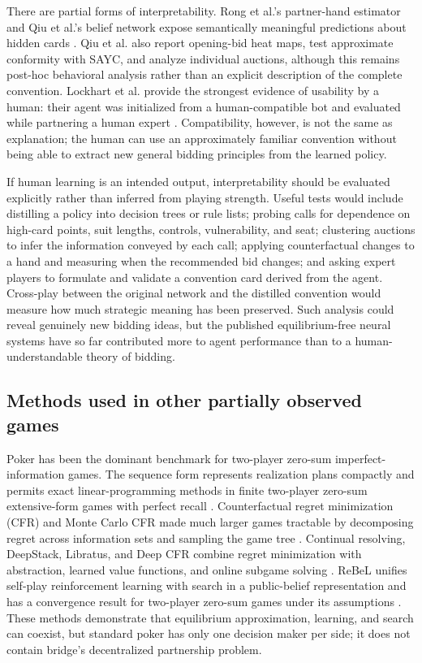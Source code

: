 \documentclass[11pt]{article}
\begin{document}
There are partial forms of interpretability. Rong et al.'s partner-hand estimator and Qiu et al.'s belief network expose semantically meaningful predictions about hidden cards \cite{rong2019competitive,qiu2024bridge}. Qiu et al. also report opening-bid heat maps, test approximate conformity with SAYC, and analyze individual auctions, although this remains post-hoc behavioral analysis rather than an explicit description of the complete convention. Lockhart et al. provide the strongest evidence of usability by a human: their agent was initialized from a human-compatible bot and evaluated while partnering a human expert \cite{lockhart2020human}. Compatibility, however, is not the same as explanation; the human can use an approximately familiar convention without being able to extract new general bidding principles from the learned policy.

If human learning is an intended output, interpretability should be evaluated explicitly rather than inferred from playing strength. Useful tests would include distilling a policy into decision trees or rule lists; probing calls for dependence on high-card points, suit lengths, controls, vulnerability, and seat; clustering auctions to infer the information conveyed by each call; applying counterfactual changes to a hand and measuring when the recommended bid changes; and asking expert players to formulate and validate a convention card derived from the agent. Cross-play between the original network and the distilled convention would measure how much strategic meaning has been preserved. Such analysis could reveal genuinely new bidding ideas, but the published equilibrium-free neural systems have so far contributed more to agent performance than to a human-understandable theory of bidding.


\subsection{Methods used in other partially observed games}

Poker has been the dominant benchmark for two-player zero-sum imperfect-information games. The sequence form represents realization plans compactly and permits exact linear-programming methods in finite two-player zero-sum extensive-form games with perfect recall \cite{koller1996sequence}. Counterfactual regret minimization (CFR) and Monte Carlo CFR made much larger games tractable by decomposing regret across information sets and sampling the game tree \cite{zinkevich2007regret,lanctot2009monte}. Continual resolving, DeepStack, Libratus, and Deep CFR combine regret minimization with abstraction, learned value functions, and online subgame solving \cite{burch2014solving,moravcik2017deepstack,brown2018superhuman,brown2019deep}. ReBeL unifies self-play reinforcement learning with search in a public-belief representation and has a convergence result for two-player zero-sum games under its assumptions \cite{brown2020rebel}. These methods demonstrate that equilibrium approximation, learning, and search can coexist, but standard poker has only one decision maker per side; it does not contain bridge's decentralized partnership problem.
\end{document}
